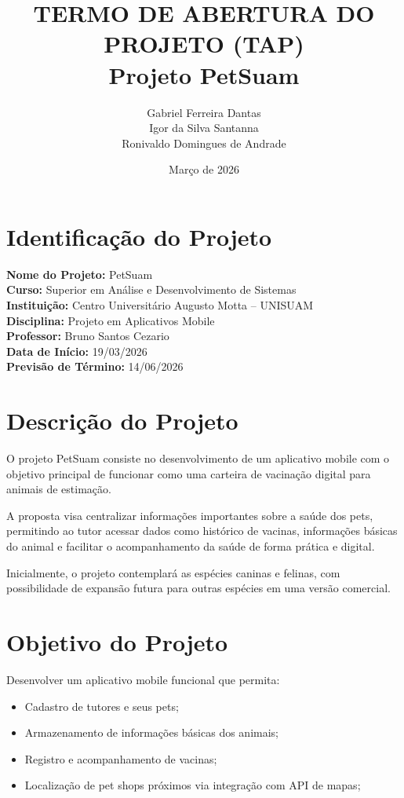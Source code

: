 \documentclass[12pt,a4paper]{article}
\title{\textbf{TERMO DE ABERTURA DO PROJETO (TAP)} \\ \vspace{0.5cm} \large Projeto PetSuam}
\author{Gabriel Ferreira Dantas \\ Igor da Silva Sant\textquotesingle anna \\ Ronivaldo Domingues de Andrade}
\date{Março de 2026}
\begin{document}
\maketitle

\section{Identificação do Projeto}
\textbf{Nome do Projeto:} PetSuam \\

\textbf{Curso:} Superior em Análise e Desenvolvimento de Sistemas \\

\textbf{Instituição:} Centro Universitário Augusto Motta -- UNISUAM \\

\textbf{Disciplina:} Projeto em Aplicativos Mobile \\

\textbf{Professor:} Bruno Santos Cezario \\

\textbf{Data de Início:} 19/03/2026 \\

\textbf{Previsão de Término:} 14/06/2026 \\

\section{Descrição do Projeto}
O projeto PetSuam consiste no desenvolvimento de um aplicativo mobile com o objetivo principal de funcionar como uma carteira de vacinação digital para animais de estimação.

A proposta visa centralizar informações importantes sobre a saúde dos pets, permitindo ao tutor acessar dados como histórico de vacinas, informações básicas do animal e facilitar o acompanhamento da saúde de forma prática e digital.

Inicialmente, o projeto contemplará as espécies caninas e felinas, com possibilidade de expansão futura para outras espécies em uma versão comercial.

\section{Objetivo do Projeto}
Desenvolver um aplicativo mobile funcional que permita:
\begin{itemize}
    \item Cadastro de tutores e seus pets;
    \item Armazenamento de informações básicas dos animais;
    \item Registro e acompanhamento de vacinas;
    \item Localização de pet shops próximos via integração com API de mapas;
\end{itemize}
\end{document}
